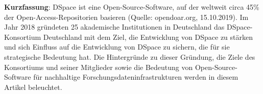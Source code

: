 \textbf{Kurzfassung}: DSpace ist eine Open-Source-Software, auf der
weltweit circa 45\% der Open-Access-Repositorien basieren (Quelle:
opendoar.org, 15.10.2019). Im Jahr 2018 gründeten 25 akademische
Institutionen in Deutschland das DSpace-Konsortium Deutschland mit dem
Ziel, die Entwicklung von DSpace zu stärken und sich Einfluss auf die
Entwicklung von DSpace zu sichern, die für sie strategische Bedeutung
hat. Die Hintergründe zu dieser Gründung, die Ziele des Konsortiums und
seiner Mitglieder sowie die Bedeutung von Open-Source-Software für
nachhaltige Forschungsdateninfrastrukturen werden in diesem Artikel
beleuchtet.
